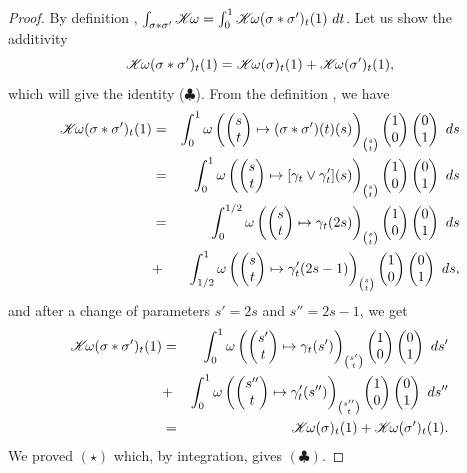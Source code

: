 \begin{proof}
  By definition ,
  $\int_{\sigma * \sigma'} \mathscr{K}\!\omega = \int_0^1 \mathscr{K}\!\omega(\sigma * \sigma')_t(1) \ dt$.
  Let us show the additivity
  \begin{equation}
    \renewcommand{\theequation}{$\star$}
    \CHK\!\omega(\sigma * \sigma')_t(1) = \CHK\!\omega(\sigma)_t(1) + \CHK\!\omega(\sigma')_t(1),
  \end{equation}
  which will give the identity ($\clubsuit$).
  From the definition ,
  we have
  \begin{eqnarray*}
    \CHK\!\omega(\sigma * \sigma')_t(1)
    & =& \int_0^1 \omega \left(\vect{s \\ t} \mapsto (\sigma * \sigma')(t) (s) \right)_{{s \choose t}}\vect{1 \\ 0} \vect{0 \\ 1} \ ds \\
    & =& \int_0^1 \omega \left(\vect{s \\ t} \mapsto [\gamma_t \vee \gamma'_t] (s) \right)_{{s \choose t}}\vect{1 \\ 0} \vect{0 \\ 1} \ ds \\
    & =& \int_0^{1/2} \omega \left(\vect{s \\ t} \mapsto \gamma_t(2s) \right)_{{s \choose t}}\vect{1 \\ 0} \vect{0 \\ 1} \ ds \\
    & + & \int_{1/2}^1 \omega \left(\vect{s \\ t} \mapsto \gamma'_t(2s-1) \right)_{{s \choose t}}\vect{1 \\ 0} \vect{0 \\ 1} \ ds,
  \end{eqnarray*}
  and after a change of parameters $s' = 2s$ and $s'' = 2s-1$, we get
  \begin{eqnarray*}
    \CHK\!\omega(\sigma * \sigma')_t(1)
    & =& \int_0^1 \omega \left(\vect{s' \\ t} \mapsto \gamma_t(s') \right)_{{s' \choose t}}\vect{1 \\ 0} \vect{0 \\ 1} \ ds' \\
    & + & \int_0^1 \omega \left(\vect{s'' \\ t} \mapsto \gamma'_t(s'') \right)_{{s'' \choose t}}\vect{1 \\ 0} \vect{0 \\ 1} \ ds'' \\
    & = & \CHK\!\omega(\sigma)_t(1) + \CHK\!\omega(\sigma')_t(1).
  \end{eqnarray*}
  We proved $(\star)$ which, by integration, gives $(\clubsuit)$.
\end{proof}

